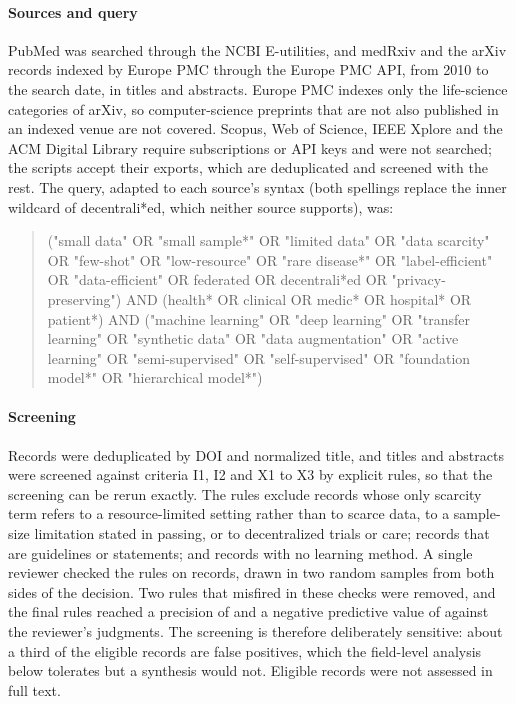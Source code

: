 \documentclass[acmsmall,screen,review]{acmart}
\theoremstyle{acmdefinition}
\begin{document}
\paragraph{Sources and query} PubMed was searched through the NCBI E-utilities, and medRxiv and the arXiv records indexed by Europe PMC through the Europe PMC API, from 2010 to the search date, in titles and abstracts. Europe PMC indexes only the life-science categories of arXiv, so computer-science preprints that are not also published in an indexed venue are not covered. Scopus, Web of Science, IEEE Xplore and the ACM Digital Library require subscriptions or API keys and were not searched; the scripts accept their exports, which are deduplicated and screened with the rest. The query, adapted to each source's syntax (both spellings replace the inner wildcard of decentrali*ed, which neither source supports), was:
\begin{quote}
\footnotesize\ttfamily
("small data" OR "small sample*" OR "limited data" OR "data scarcity" OR "few-shot" OR "low-resource" OR "rare disease*" OR "label-efficient" OR "data-efficient" OR federated OR decentrali*ed OR "privacy-preserving") AND (health* OR clinical OR medic* OR hospital* OR patient*) AND ("machine learning" OR "deep learning" OR "transfer learning" OR "synthetic data" OR "data augmentation" OR "active learning" OR "semi-supervised" OR "self-supervised" OR "foundation model*" OR "hierarchical model*")
\end{quote}

\paragraph{Screening} Records were deduplicated by DOI and normalized title, and titles and abstracts were screened against criteria I1, I2 and X1 to X3 by explicit rules, so that the screening can be rerun exactly. The rules exclude records whose only scarcity term refers to a resource-limited setting rather than to scarce data, to a sample-size limitation stated in passing, or to decentralized trials or care; records that are guidelines or statements; and records with no learning method. A single reviewer checked the rules on \PrismaVerifyN{} records, drawn in two random samples from both sides of the decision. Two rules that misfired in these checks were removed, and the final rules reached a precision of \PrismaVerifyPrecision{} and a negative predictive value of \PrismaVerifyNPV{} against the reviewer's judgments. The screening is therefore deliberately sensitive: about a third of the eligible records are false positives, which the field-level analysis below tolerates but a synthesis would not. Eligible records were not assessed in full text.
\end{document}
